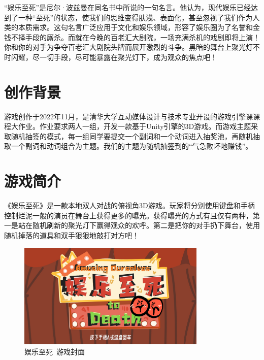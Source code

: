 



“娱乐至死”是尼尔·波兹曼在同名书中所说的一句名言。他认为，现代娱乐已经达到了一种“至死”的状态，使我们的思维变得肤浅、表面化，甚至忽视了我们作为人类的本质需求。这句名言广泛应用于文化和娱乐领域，形容了娱乐圈为了名誉和金钱不择手段的厮杀。而就在今晚的百老汇大剧院，一场充满杀机的戏剧即将上演！你和你的对手为争夺百老汇大剧院头牌而展开激烈的斗争。黑暗的舞台上聚光灯不时闪耀，尽一切手段，尽可能暴露在聚光灯下，成为观众的焦点吧！


\section{创作背景}
游戏创作于2022年11月，是清华大学互动媒体设计与技术专业开设的游戏引擎课课程大作业。作业要求两人一组，开发一款基于Unity引擎的3D游戏。而游戏主题采取随机抽签的模式，每一组同学要提交一个副词和一个动词进入抽奖池，再随机抽取一个副词和动词组合为主题。我们的主题为随机抽签到的“气急败坏地赚钱”。

\section{游戏简介}
《娱乐至死》是一款本地双人对战的俯视角3D游戏。玩家将分别使用键盘和手柄控制烂泥一般的演员在舞台上获得更多的曝光。获得曝光的方式有且仅有两种，第一是站在随机刷新的聚光灯下赢得观众的欢呼。第二是把你的对手扔下舞台，使用随机掉落的道具和双手狠狠地敲打对方吧！


\begin{figure}[H]
    \centering
    \includegraphics[width=0.8\textwidth]{Images/娱乐至死/ylzs.jpeg}
    \caption{娱乐至死\ 游戏封面}
\end{figure}

